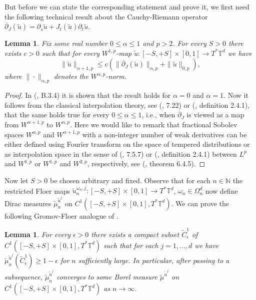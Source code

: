 \documentclass[a4paper,11pt]{amsart}
\newcommand{\NN}{\mathbb{N}}
\newcommand{\TT}{\mathbb{T}}
\newtheorem{lemma}[theorem]{Lemma}
\begin{document}
\indent But before we can state the corresponding statement and prove it, we first need the following technical result about the Cauchy-Riemann operator $\overline{\partial}_J(\widetilde{u})=\partial_s\widetilde{u}+J_t(\widetilde{u})\partial_t\widetilde{u}$.
\begin{lemma}\label{regularity} Fix some real number $0\leq\alpha\leq 1$ and $p>2$. For every $S>0$ there exists $c>0$ such that for every $W^{1,p}$-map $\widetilde{u}:[-S,+S]\times[0,1]\to T^*\TT^d$ we have \[\|\widetilde{u}\|_{\alpha+1,p}\leq c\left(\|\overline{\partial}_J(\widetilde{u})\|_{\alpha,p}+\|\widetilde{u}\|_{0,p}\right),\] where $\|\cdot\|_{\alpha,p}$ denotes the $W^{\alpha,p}$-norm.\end{lemma}
\begin{proof}
In (\cite{MDSa}, B.3.4) it is shown that the result holds for $\alpha=0$ and $\alpha=1$. Now it follows from the classical interpolation theory, see (\cite{AF}, 7.22) or (\cite{BL}, definition 2.4.1), that the same holds true for every $0\leq\alpha\leq 1$, i.e.,  when $\overline{\partial}_J$ is viewed as a map from $W^{\alpha+1,p}$ to $W^{\alpha,p}$. Here we would like to remark that fractional Sobolev spaces $W^{\alpha,p}$ and $W^{\alpha+1,p}$ with a non-integer number of weak derivatives can be either defined using Fourier transform on the space of tempered distributions or as interpolation space in the sense of (\cite{AF}, 7.5.7) or (\cite{BL}, definition 2.4.1)  between $L^p$ and $W^{1,p}$ or $W^{1,p}$ and $W^{2,p}$, respectively, see (\cite{BL}, theorem 6.4.5).
\end{proof}
Now let $S>0$ be chosen arbitrary and fixed. Observe that for each $n\in\NN$ the restricted Floer maps $\widetilde{u}^{\omega_n,j}_n: [-S,+S]\times [0,1]\to T^*\TT^d$, $\omega_n\in\Omega_n^d$  now define Dirac measures $\widetilde{\mu}^{\widetilde{u}^j}_n$ on $C^1([-S,+S]\times [0,1],T^*\TT^d)$. We can prove the following Gromov-Floer analogue of .
\begin{lemma}\label{tight-Floer}
    For every $\epsilon>0$ there exists a compact subset $\widetilde{C}^1_{\epsilon}$ of $C^1([-S,+S]\times[0,1],T^*\TT^d)$ such that for each $j=1,\ldots,d$ we have $\widetilde{\mu}^{\widetilde{u}^j}_n(\widetilde{C}^1_{\epsilon})\geq 1-\epsilon$ for $n$ sufficiently large. In particular, after passing to a subsequence, $\widetilde{\mu}^{\widetilde{u}^j}_n$ converges to some Borel measure $\widetilde{\mu}^{\widetilde{u}^j}$ on $C^1([-S,+S]\times[0,1],T^*\TT^d)$ as $n\to\infty$. 
\end{lemma}
\end{document}
